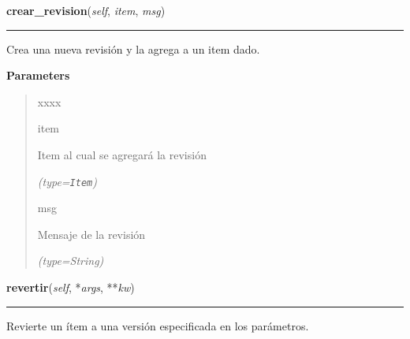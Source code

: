     \vspace{0.5ex}

\hspace{.8\funcindent}\begin{boxedminipage}{\funcwidth}

    \raggedright \textbf{crear\_revision}(\textit{self}, \textit{item}, \textit{msg})

    \vspace{-1.5ex}

    \rule{\textwidth}{0.5\fboxrule}
\setlength{\parskip}{2ex}
    Crea una nueva revisión y la agrega a un item dado.

\setlength{\parskip}{1ex}
      \textbf{Parameters}
      \vspace{-1ex}

      \begin{quote}
        \begin{Ventry}{xxxx}

          \item[item]

          Item al cual se agregará la revisión

            {\it (type=\texttt{Item})}

          \item[msg]

          Mensaje de la revisión

            {\it (type=String)}

        \end{Ventry}

      \end{quote}

    \end{boxedminipage}

    \label{saip:controllers:version_controller:VersionController:revertir}

    \vspace{0.5ex}

\hspace{.8\funcindent}\begin{boxedminipage}{\funcwidth}

    \raggedright \textbf{revertir}(\textit{self}, *\textit{args}, **\textit{kw})

    \vspace{-1.5ex}

    \rule{\textwidth}{0.5\fboxrule}
\setlength{\parskip}{2ex}
    Revierte un ítem a una versión especificada en los parámetros.

\setlength{\parskip}{1ex}
    \end{boxedminipage}

